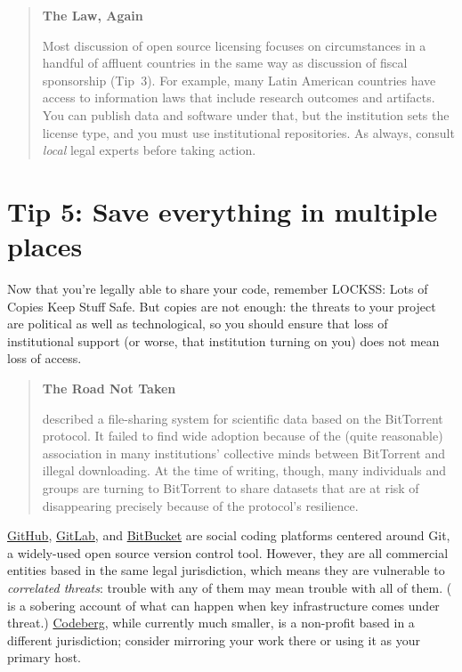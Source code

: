 \documentclass[10pt,letterpaper]{article}
\begin{document}
\begin{quote}
  \noindent
  \textbf{The Law, Again}

  Most discussion of open source licensing focuses on circumstances in a handful of affluent countries
  in the same way as discussion of fiscal sponsorship (Tip~3).
  For example,
  many Latin American countries have access to information laws that include research outcomes and artifacts.
  You can publish data and software under that,
  but the institution sets the license type,
  and you must use institutional repositories.
  As always,
  consult \emph{local} legal experts before taking action.
\end{quote}

\section*{Tip 5: Save everything in multiple places}

Now that you're legally able to share your code, remember LOCKSS: Lots of Copies Keep Stuff Safe.
But copies are not enough:
the threats to your project are political as well as technological,
so you should ensure that loss of institutional support
(or worse, that institution turning on you)
does not mean loss of access.

\begin{quote}
  \noindent
  \textbf{The Road Not Taken}

  \cite{Langille2010} described a file-sharing system for scientific data
  based on the BitTorrent protocol.
  It failed to find wide adoption because of the (quite reasonable) association in many institutions' collective minds
  between BitTorrent and illegal downloading.
  At the time of writing,
  though,
  many individuals and groups are turning to BitTorrent to share datasets that are at risk of disappearing
  precisely because of the protocol's resilience.
\end{quote}

\href{https://github.com/}{GitHub},
\href{https://gitlab.com}{GitLab},
and \href{https://bitbucket.org/}{BitBucket}
are social coding platforms centered around Git,
a widely-used open source version control tool.
However,
they are all commercial entities based in the same legal jurisdiction,
which means they are vulnerable to \emph{correlated threats}:
trouble with any of them may mean trouble with all of them.
(\cite{Tamburri2020} is a sobering account of what can happen when key infrastructure comes under threat.)
\href{https://codeberg.org/}{Codeberg},
while currently much smaller,
is a non-profit based in a different jurisdiction;
consider mirroring your work there or using it as your primary host.
\end{document}
